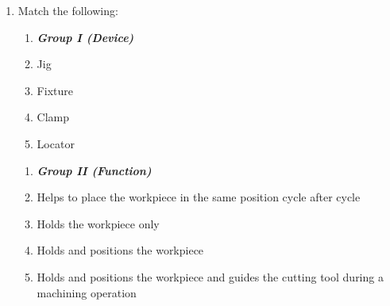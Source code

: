 \documentclass[journal,12pt,onecolumn]{IEEEtran}
\theoremstyle{remark}
\begin{document}
\begin{enumerate}
\noindent
\begin{multicols}{2}
\begin{enumerate}[label=\Alph*.]
    \item[]  \textit{\textbf{Group I (Product)}}
    \item Refrigerator liners
    \item Composite pressure vessels
    \item Hollow parts of thermoset plastics
    \item Rubber sheets
\end{enumerate}
\columnbreak
\begin{enumerate}[label=\arabic*.]
    \item[] \textit{\textbf{Group II (Manufacturing Process)}}
    \item Filament winding
    \item Thermoforming
    \item Calendering
    \item Rotational moulding
\end{enumerate}
\end{multicols}


\begin{multicols}{2}
\begin{enumerate}
    \item P-2, Q-1, R-4, S-3
    \item P-1, Q-2, R-3, S-4
    \item P-1, Q-4, R-2, S-3
    \item P-2, Q-4, R-1, S-3
\end{enumerate}
\end{multicols}
\hfill (GATE PI 2009)
\noindent 
\item Match the following:
{
\setlength{\columnsep}{-8cm}
\begin{multicols}{2}
\begin{enumerate}[label=\Alph*.]
    \item[]  \textit{\textbf{Group I (Device)}}
    \item Jig
    \item Fixture
    \item Clamp
    \item Locator
\end{enumerate}
\columnbreak
\begin{enumerate}[label=\arabic*.]
    \item[] \textit{\textbf{Group II (Function)}}
    \item Helps to place the workpiece in the same position cycle after cycle
    \item Holds the workpiece only
    \item Holds and positions the workpiece
    \item Holds and positions the workpiece and guides the cutting tool during a machining operation
\end{enumerate}
\end{multicols}
}


\end{enumerate}
\end{document}
